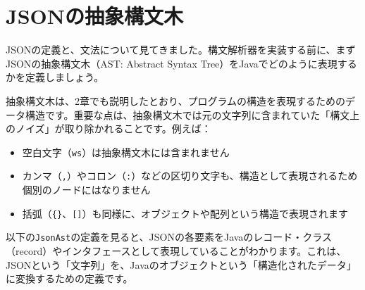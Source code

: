 \hypertarget{chapter3-jsonux306eux62bdux8c61ux69cbux6587ux6728}{%
\section{JSONの抽象構文木}\label{chapter3-jsonux306eux62bdux8c61ux69cbux6587ux6728}}

JSONの定義と、文法について見てきました。構文解析器を実装する前に、まずJSONの抽象構文木（AST:
Abstract Syntax Tree）をJavaでどのように表現するかを定義しましょう。

抽象構文木は、2章でも説明したとおり、プログラムの構造を表現するためのデータ構造です。重要な点は、抽象構文木では元の文字列に含まれていた「構文上のノイズ」が取り除かれることです。例えば：

\begin{itemize}
\tightlist
\item
  空白文字（\texttt{ws}）は抽象構文木には含まれません
\item
  カンマ（\texttt{,}）やコロン（\texttt{:}）などの区切り文字も、構造として表現されるため個別のノードにはなりません
\item
  括弧（\texttt{\{\}}、\texttt{{[}{]}}）も同様に、オブジェクトや配列という構造で表現されます
\end{itemize}

以下の\texttt{JsonAst}の定義を見ると、JSONの各要素をJavaのレコード・クラス（record）やインタフェースとして表現していることがわかります。これは、JSONという「文字列」を、Javaのオブジェクトという「構造化されたデータ」に変換するための定義です。

